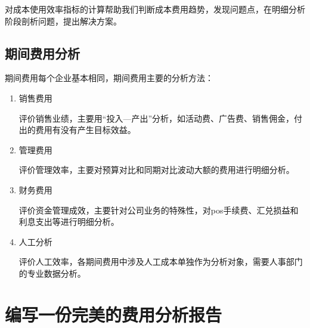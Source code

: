 \documentclass[a4paper]{article}
\begin{document}
对成本使用效率指标的计算帮助我们判断成本费用趋势，发现问题点，在明细分析阶段剖析问题，提出解决方案。

\subsection{期间费用分析}
期间费用每个企业基本相同，期间费用主要的分析方法：

\begin{enumerate}
	\item 销售费用
	
	评价销售业绩，主要用“投入—产出”分析，如活动费、广告费、销售佣金，付出的费用有没有产生目标效益。
	\item 管理费用
	
	评价管理效率，主要对预算对比和同期对比波动大额的费用进行明细分析。
	
	\item 财务费用
	
	评价资金管理成效，主要针对公司业务的特殊性，对pos手续费、汇兑损益和利息支出等进行明细分析。

	\item 人工分析
	
	评价人工效率，各期间费用中涉及人工成本单独作为分析对象，需要人事部门的专业数据分析。
%		
%		
%		
%		
%		
%	

\end{enumerate}

\section{编写一份完美的费用分析报告}
\end{document}
